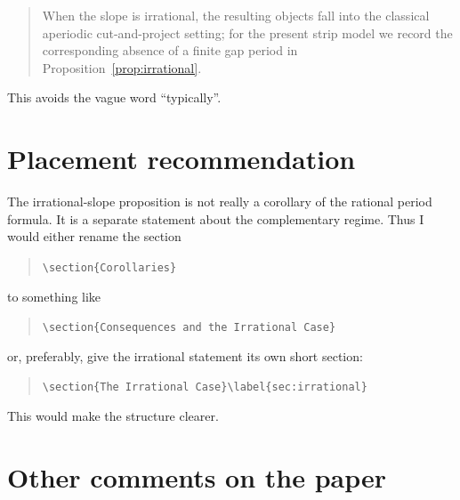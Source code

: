 \documentclass[11pt]{article}
\begin{document}
\begin{quote}
When the slope is irrational, the resulting objects fall into the classical
aperiodic cut-and-project setting; for the present strip model we record the
corresponding absence of a finite gap period in
Proposition~\ref{prop:irrational}.
\end{quote}

This avoids the vague word ``typically''.

\section*{Placement recommendation}

The irrational-slope proposition is not really a corollary of the rational
period formula.  It is a separate statement about the complementary regime.
Thus I would either rename the section
\begin{quote}
\verb|\section{Corollaries}|
\end{quote}
to something like
\begin{quote}
\verb|\section{Consequences and the Irrational Case}|
\end{quote}
or, preferably, give the irrational statement its own short section:
\begin{quote}
\verb|\section{The Irrational Case}\label{sec:irrational}|
\end{quote}
This would make the structure clearer.

\section*{Other comments on the paper}
\end{document}
